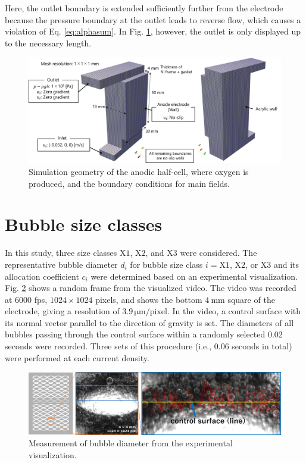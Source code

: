 \documentclass[3p, twocolumn, 10pt]{elsarticle}
\begin{document}
Here, the outlet boundary is extended sufficiently further from the electrode because the pressure boundary at the outlet leads to reverse flow, which causes a violation of Eq. \ref{eq:alphasum}.
In Fig. \ref{fig:sim.geometry}, however, the outlet is only displayed up to the necessary length.
\begin{figure}[h]
  \centering
  \includegraphics[width=1\linewidth]{Picture3.png}
  \caption{Simulation geometry of the anodic half-cell, where oxygen is produced, and the boundary conditions for main fields.}
  \label{fig:sim.geometry}
\end{figure}

\section{Bubble size classes}\label{sec:bubbleSizeClasses}
In this study, three size classes $\mathrm{X1}$, $\mathrm{X2}$, and $\mathrm{X3}$ were considered.
The representative bubble diameter $d_{i}$ for bubble size class $i=\mathrm{X1}$, $\mathrm{X2}$, or $\mathrm{X3}$ and its allocation coefficient $c_{i}$ were determined based on an experimental visualization.
Fig. \ref{fig:electrode_vid} shows a random frame from the visualized video.
The video was recorded at $6000$ fps, $1024\times 1024$ pixels, and shows the bottom $4\ \mathrm{mm}$ square of the electrode, giving a resolution of $3.9\,\si{\micro\metre}/\mathrm{pixel}$.
In the video, a control surface with its normal vector parallel to the direction of gravity is set.
The diameters of all bubbles passing through the control surface within a randomly selected 0.02 seconds were recorded.
Three sets of this procedure (i.e., $0.06$ seconds in total) were performed at each current density.
\begin{figure}[h]
  \centering
  \includegraphics[width=1\linewidth]{Picture1.png}
  \caption{Measurement of bubble diameter from the experimental visualization. }
  \label{fig:electrode_vid}
\end{figure}
\end{document}
